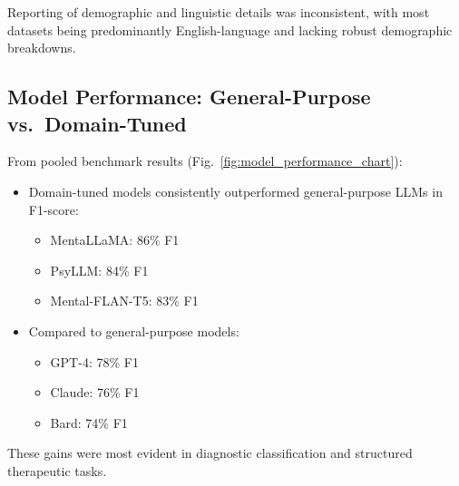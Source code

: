 \documentclass[journal]{IEEEtran}
\begin{document}
Reporting of demographic and linguistic details was inconsistent, with most datasets being predominantly English-language and lacking robust demographic breakdowns.

\begin{table}[htbp]
\centering
\caption{Dataset source distribution and reporting practices}
\label{tab:dataset_sources}
\end{table}


\subsection{Model Performance: General-Purpose vs.\ Domain-Tuned}
From pooled benchmark results (Fig.~\ref{fig:model_performance_chart}):
\begin{itemize}
    \item Domain-tuned models consistently outperformed general-purpose LLMs in F1-score:
    \begin{itemize}
        \item MentaLLaMA: 86\% F1
        \item PsyLLM: 84\% F1
        \item Mental-FLAN-T5: 83\% F1
    \end{itemize}
    \item Compared to general-purpose models:
    \begin{itemize}
        \item GPT-4: 78\% F1
        \item Claude: 76\% F1
        \item Bard: 74\% F1
    \end{itemize}
\end{itemize}
These gains were most evident in diagnostic classification and structured therapeutic tasks.
\end{document}
